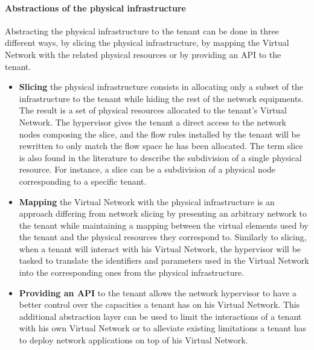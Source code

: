 \paragraph{Abstractions of the physical infrastructure}
Abstracting the physical infrastructure to the tenant can be done in three different ways, by slicing the physical infrastructure, by mapping the Virtual Network with the related physical resources or by providing an API to the tenant.
\begin{itemize}
    \item 
\textbf{Slicing} the physical infrastructure
\cite{FlowVisor-Sherwood2009}
consists in allocating only a subset of the infrastructure to the tenant while hiding the rest of the network equipments.
The result is a set of physical resources allocated to the tenant's Virtual Network.
The hypervisor gives the tenant a direct access to the network nodes composing the slice, and the flow rules installed by the tenant will be rewritten to only match the flow space he has been allocated.
The term slice is also found in the literature to describe the subdivision of a single physical resource. For instance, a slice can be a subdivision of a physical node corresponding to a specific tenant.

\item \textbf{Mapping} the Virtual Network with the physical infrastructure is an approach differing from network slicing by presenting an arbitrary network to the tenant while maintaining a mapping between the virtual elements used by the tenant and the physical resources they correspond to.
Similarly to slicing, when a tenant will interact with his Virtual Network, the hypervisor will be tasked to translate the identifiers and parameters used in the Virtual Network into the corresponding ones from the physical infrastructure.

\item \textbf{Providing an API} to the tenant allows the network hypervisor to have a better control over the capacities a tenant has on his Virtual Network. This additional abstraction layer can be used to limit the interactions of a tenant with his own Virtual Network or to alleviate existing limitations a tenant has to deploy network applications on top of his Virtual Network. 

\end{itemize}


